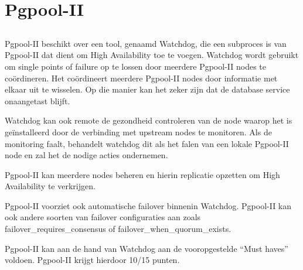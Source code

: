 
\chapter{Pgpool-II}
\label{ch:Pgpool-II}



\section{}
\label{sec:Inleiding tot Pgpool-II}

\section{}
\label{sec:Requirements}

\subsection{}
\label{subsec:Must have}

Pgpool-II beschikt over een tool, genaamd Watchdog, die een subproces is van Pgpool-II dat dient om High Availability toe te voegen. Watchdog wordt gebruikt om single points of failure op te lossen door meerdere Pgpool-II nodes te coördineren. Het coördineert meerdere Pgpool-II nodes door informatie met elkaar uit te wisselen. Op die manier kan het zeker zijn dat de database service onaangetast blijft.

Watchdog kan ook remote de gezondheid controleren van de node waarop het is geïnstalleerd door de verbinding met upstream nodes te monitoren. Als de monitoring faalt, behandelt watchdog dit als het falen van een lokale Pgpool-II node en zal het de nodige acties ondernemen.

Pgpool-II kan meerdere nodes beheren en hierin replicatie opzetten om High Availability te verkrijgen.

Pgpool-II voorziet ook automatische failover binnenin Watchdog. Pgpool-II kan ook andere soorten van failover configuraties aan zoals failover\_requires\_consensus of failover\_when\_quorum\_exists. 

Pgpool-II kan aan de hand van Watchdog aan de vooropgestelde “Must haves” voldoen. Pgpool-II krijgt hierdoor 10/15 punten.

